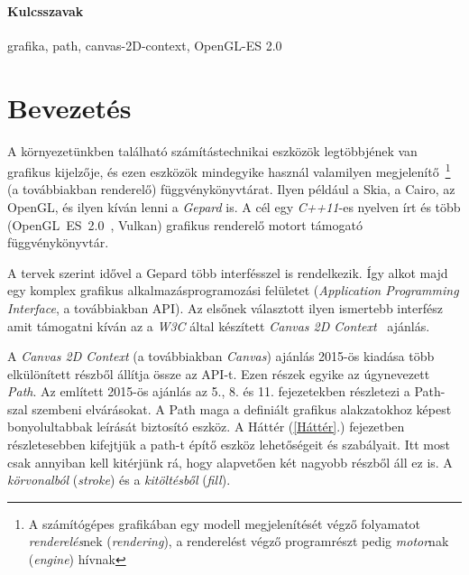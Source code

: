 \documentclass[12pt]{report}
\theoremstyle{definition}
\newcommand{\inenglish}[1]{\textsl{#1}}
\newcommand{\inenglishfn}[1]{\footnotesize{\inenglish{#1}}}
\begin{document}
    \subsubsection*{Kulcsszavak}

grafika, path, canvas-2D-context, OpenGL-ES 2.0



    \chapter*{Bevezetés}
    \label{Bevezetés}

  A környezetünkben található számítástechnikai eszközök
legtöbbjének van grafikus kijelzője, és ezen eszközök mindegyike használ
valamilyen megjelenítő~\footnote{A számítógépes grafikában egy modell
megjelenítését végző folyamatot \emph{renderelés}nek (\inenglishfn{rendering}),
a renderelést végző programrészt pedig \emph{motor}nak (\inenglishfn{engine})
hívnak} (a továbbiakban renderelő) függvénykönyvtárat. Ilyen például a Skia, a
Cairo, az OpenGL, és ilyen kíván lenni a \emph{Gepard} is. A cél egy
\emph{C++11}-es nyelven írt és több (\mbox{OpenGL~ES~2.0
\cite{Munshi:2008:OEP:1481069}}, Vulkan) grafikus renderelő motort támogató
függvénykönyvtár.

  A tervek szerint idővel a Gepard több interfésszel is rendelkezik.
Így alkot majd egy komplex grafikus alkalmazásprogramozási felületet
(\inenglish{Application Programming Interface}, a továbbiakban API). Az elsőnek
választott ilyen ismertebb interfész amit támogatni kíván az a \emph{W3C} által
készített \emph{Canvas 2D Context}~\cite{Cabanier:14:HCC} ajánlás.

  A \emph{Canvas 2D Context} (a továbbiakban \emph{Canvas}) ajánlás
2015-ös kiadása több elkülönített részből állítja össze az API-t. Ezen részek
egyike az úgynevezett \emph{Path}. Az említett 2015-ös ajánlás az 5., 8. és 11.
fejezetekben részletezi a Path-szal szembeni elvárásokat. A Path maga a
definiált grafikus alakzatokhoz képest bonyolultabbak leírását biztosító
eszköz. A Háttér (\ref{Háttér}.) fejezetben részletesebben kifejtjük a path-t
építő eszköz lehetőségeit és szabályait. Itt most csak annyiban kell kitérjünk
rá, hogy alapvetően két nagyobb részből áll ez is. A \emph{körvonalból}
(\inenglish{stroke}) és a \emph{kitöltésből} (\inenglish{fill}).
\end{document}
